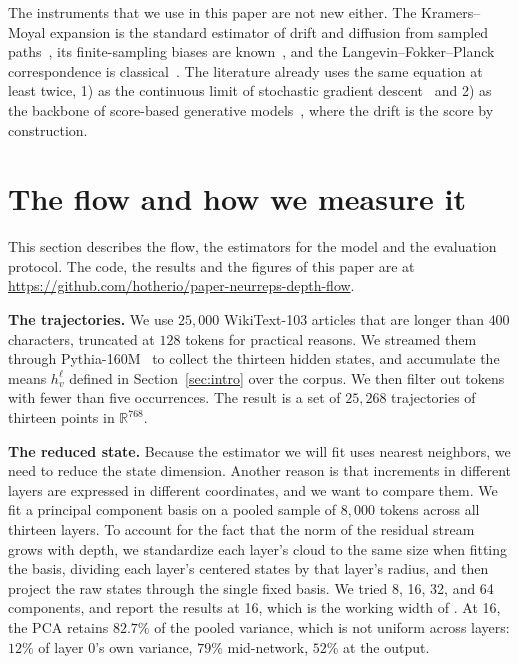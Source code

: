 \documentclass[mlmain]{jmlr}
\begin{document}
The instruments that we use in this paper are not new either.
The Kramers--Moyal expansion is the standard estimator of drift and
diffusion from sampled paths~\citep{friedrich2011approaching}, its
finite-sampling biases are known~\citep{lade2009finite}, and the
Langevin--Fokker--Planck correspondence is
classical~\citep{risken1989fokker}. The literature already uses the same
equation at least twice, 1) as the continuous limit of stochastic gradient
descent~\citep{mandt2017stochastic} and 2) as the backbone of score-based
generative models~\citep{song2021scorebased}, where the drift is the
score by construction.


\section{The flow and how we measure it}
\label{sec:flow}

This section describes the flow, the estimators for the model and the evaluation protocol. The code, the results and the figures of this paper are at \url{https://github.com/hotherio/paper-neurreps-depth-flow}.

\textbf{The trajectories.} We use $25{,}000$ WikiText-103 articles
that are longer than $400$ characters, truncated at $128$ tokens for practical reasons.
We streamed them through Pythia-160M~\citep{biderman2023pythia} to collect the thirteen hidden states, 
and accumulate the means $h^{\ell}_{v}$ defined in  Section~\ref{sec:intro} over the corpus. We then filter out 
tokens with fewer than five occurrences. %
The result is a set of $25{,}268$ trajectories of thirteen points in $\mathbb{R}^{768}$.


\textbf{The reduced state.} Because the estimator we will fit uses nearest neighbors, we need to reduce the state dimension. 
Another reason is that increments in different layers are expressed in different coordinates, and we want to compare them.
We fit a principal component basis on a pooled sample of $8{,}000$ tokens across all thirteen layers. 
To account for the fact that the norm of the residual stream grows with
depth, we standardize each layer's cloud to the same size when fitting
the basis, dividing each layer's centered states by that layer's radius,
and then project the raw states through the single fixed basis. We tried 8, 16, 32, and 64 components, 
and report the results at 16, which is the working width of \citet{yomdin2024jump}.
At 16, the PCA retains $82.7\%$ of the pooled variance,
which is not uniform across layers: $12\%$ of layer $0$'s own variance,
$79\%$ mid-network, $52\%$ at the output. 
\end{document}
